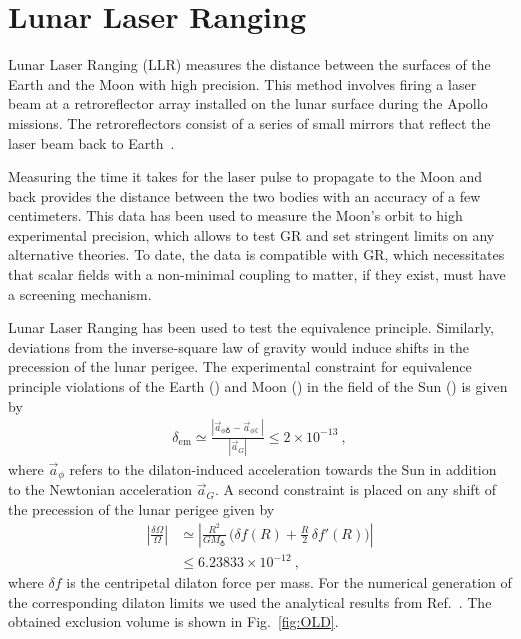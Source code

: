 \documentclass[aps,pra,twocolumn,floatfix,superscriptaddress,nofootinbib,showpacs,a4paper,balancelastpage,twoside]{revtex4-2}
\begin{document}
\section{Lunar Laser Ranging}

Lunar Laser Ranging (LLR) measures the distance between the surfaces of the Earth and the Moon with high precision. This method involves firing a laser beam at a retroreflector array installed on the lunar surface during the Apollo missions. The retroreflectors consist of a series of small mirrors that reflect the laser beam back to  Earth~\cite{muller2019lunar}.

Measuring the time it takes for the laser pulse to propagate to the Moon and back provides the distance between the two bodies with an accuracy of a few centimeters. This data has been used to measure the Moon's orbit to high experimental precision, which allows to test GR and set stringent limits on any alternative theories. To date, the data is compatible with GR, which necessitates that scalar fields with a non-minimal coupling to matter, if they exist, must have a screening mechanism.

Lunar Laser Ranging has been used to test the equivalence principle. Similarly, deviations from the inverse-square law of gravity would induce shifts in the precession of the lunar perigee. The experimental constraint for equivalence principle violations of the Earth (\earth) and Moon (\leftmoon) in the field of the  Sun (\sun) is given by~\cite{Brax:2022uyh,nordtvedt2001lunar}
\begin{align}
\delta_{\text{em}}\simeq \frac{|\vec{a}_{\phi \earth}-\vec{a}_{\phi \leftmoon}|}{|\vec{a}_G|}  \leq 2 \times 10^{-13}\>,
\end{align}
where $\vec{a}_\phi$ refers to the dilaton-induced acceleration towards the Sun in addition to the Newtonian acceleration $\vec{a}_G$.
A second constraint is placed on any shift of the precession of the lunar perigee given by
\begin{align}
\left|\frac{\delta \Omega}{\Omega}\right| &\simeq \left| \frac{R^2}{G M_{\earth}}\,\big(\delta f(R) + \frac{R}{2}\, \delta f'(R)\big)\right|\nonumber\\
& \leq 6.23833 \times 10^{-12}\>,
\end{align}
where $\delta f$ is the centripetal dilaton force per mass.
For the numerical generation of the corresponding dilaton limits we used the analytical results from Ref.~\cite{Brax:2022uyh}. The obtained exclusion volume is shown in Fig.~\ref{fig:OLD}.
\end{document}
